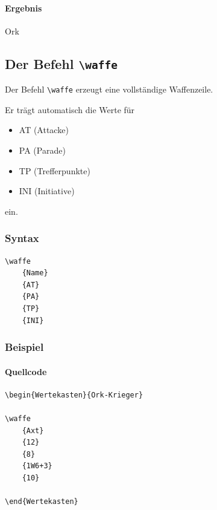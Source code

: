 \paragraph{Ergebnis}

\begin{Wertekasten}{Ork}


\end{Wertekasten}


\subsection{Der Befehl \texttt{\textbackslash waffe}}

Der Befehl \verb|\waffe| erzeugt eine vollständige Waffenzeile.

Er trägt automatisch die Werte für

\begin{itemize}
\item AT (Attacke)
\item PA (Parade)
\item TP (Trefferpunkte)
\item INI (Initiative)
\end{itemize}

ein.

\subsubsection*{Syntax}

\begin{Verbatim}
\waffe
    {Name}
    {AT}
    {PA}
    {TP}
    {INI}
\end{Verbatim}

\subsubsection*{Beispiel}

\paragraph{Quellcode}

\begin{Verbatim}
\begin{Wertekasten}{Ork-Krieger}

\waffe
    {Axt}
    {12}
    {8}
    {1W6+3}
    {10}

\end{Wertekasten}
\end{Verbatim}

